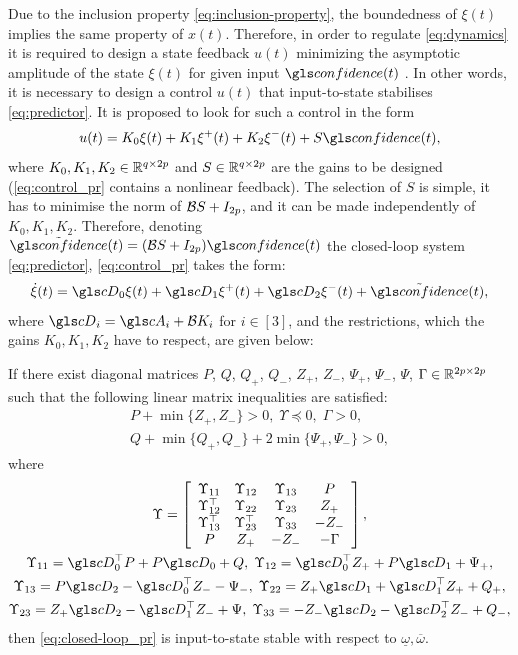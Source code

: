 Due to the inclusion property \eqref{eq:inclusion-property}, the boundedness of $\xi(t)$
implies the same property of $x(t)$. Therefore, in order to regulate
\eqref{eq:dynamics} it is required to design a state feedback $u(t)$
minimizing the asymptotic amplitude of the state $\xi(t)$ for given
input $\confidence(t)$ \citep{Efimov_tac2013}. In other words, it is necessary
to design a control $u(t)$ that input-to-state stabilises \eqref{eq:predictor}.
It is proposed to look for such a control in the form
\begin{equation}
u(t)=K_{0}\xi(t)+K_{1}\xi^{+}(t)+K_{2}\xi^{-}(t)+S\confidence(t),\label{eq:control_pr}
\end{equation}
where $K_{0},K_{1},K_{2}\in\mathbb{R}^{q\times2p}$ and $S\in\mathbb{R}^{q\times2p}$
are the gains to be designed (\eqref{eq:control_pr} contains a nonlinear
feedback). The selection of $S$ is simple, it has to minimise the
norm of $\mathcal{B} S+I_{2p}$, and it can be made independently of $K_{0},K_{1},K_{2}$.
Therefore, denoting $\tilde{\confidence}(t)=(\cB S+I_{2p})\confidence(t)$ the
closed-loop system \eqref{eq:predictor}, \eqref{eq:control_pr} takes
the form:
\begin{equation}
\dot{\xi}(t)=\cD_{0}\xi(t)+\cD_{1}\xi^{+}(t)+\cD_{2}\xi^{-}(t)+\tilde{\confidence}(t),\label{eq:closed-loop_pr}
\end{equation}
where $\cD_{i}=\cA_{i}+\cB K_{i}$ for $i\in[3]$, and the restrictions,
which the gains $K_{0},K_{1},K_{2}$ have to respect, are given below:
\begin{theorem}
	\begin{leftbar}[theorembar]
	\label{thm:ISS_pr} If there exist diagonal matrices $P$, $Q$, $Q_{+}$,
	$Q_{-}$, $Z_{+}$, $Z_{-}$, $\Psi_{+}$, $\Psi_{-}$, $\Psi$, $\Gamma\in\mathbb{R}^{2p\times2p}$
	such that the following linear matrix inequalities are satisfied:
	\begin{gather*}
	P+\min\{Z_{+},Z_{-}\}>0,\;\Upsilon\preceq0,\;\Gamma>0,\\
	Q+\min\{Q_{+},Q_{-}\}+2\min\{\Psi_{+},\Psi_{-}\}>0,
	\end{gather*}
	where
	\begin{gather*}
	\Upsilon=\left[\begin{array}{cccc}
	\Upsilon_{11} & \Upsilon_{12} & \Upsilon_{13} & P\\
	\Upsilon_{12}^{\top} & \Upsilon_{22} & \Upsilon_{23} & Z_{+}\\
	\Upsilon_{13}^{\top} & \Upsilon_{23}^{\top} & \Upsilon_{33} & -Z_{-}\\
	P & Z_{+} & -Z_{-} & -\Gamma
	\end{array}\right],\\
	\Upsilon_{11}=\cD_{0}^{\top}P+P\cD_{0}+Q,\;\Upsilon_{12}=\cD_{0}^{\top}Z_{+}+P\cD_{1}+\Psi_{+},\\
	\Upsilon_{13}=P\cD_{2}-\cD_{0}^{\top}Z_{-}-\Psi_{-},\;\Upsilon_{22}=Z_{+}\cD_{1}+\cD_{1}^{\top}Z_{+}+Q_{+},\\
	\Upsilon_{23}=Z_{+}\cD_{2}-\cD_{1}^{\top}Z_{-}+\Psi,\;\Upsilon_{33}=-Z_{-}\cD_{2}-\cD_{2}^{\top}Z_{-}+Q_{-},
	\end{gather*}
	then \eqref{eq:closed-loop_pr} is input-to-state stable with respect
	to $\underline{\omega},\overline{\omega}$.
	\end{leftbar}
\end{theorem}

